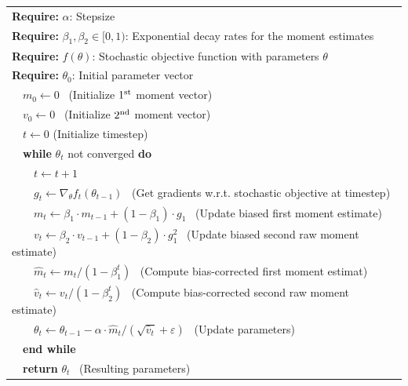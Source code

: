 \documentclass[12pt]{article}
\begin{document}
\hrulefill
\begin{center}
    \begin{tabular}{l}
        \textbf{Require:} $\alpha$: Stepsize\\
        \textbf{Require:} $\beta_1,\beta_2\in [0,1)$: Exponential decay rates for 
        the moment estimates\\
        \textbf{Require:} $f(\theta)$:  Stochastic objective function with 
        parameters $\theta$\\
        \textbf{Require:} $\theta_0$: Initial parameter vector\\
        \ \ $m_0\leftarrow0$ \ (Initialize $\rm 1^{st}$ moment vector)\\
        \ \ $v_0\leftarrow0$  \ (Initialize $\rm 2^{nd}$ moment vector)\\
        \ \ $t\leftarrow0$  (Initialize timestep)\\
        \ \ \textbf{while} $\theta_t$ not converged \textbf{do}\\
        \ \ \ \ $t\leftarrow t+1$\\
        \ \ \ \ $g_t\leftarrow\nabla_\theta f_t(\theta_{t-1})$ \ (Get gradients 
        w.r.t. stochastic objective at timestep)\\
        \ \ \ \ $m_t\leftarrow\beta_1\cdot m_{t-1}+(1-\beta_1)\cdot g_1$ \ (Update biased 
        first moment estimate)\\
        \ \ \ \ $v_t\leftarrow\beta_2\cdot v_{t-1}+(1-\beta_2)\cdot g_1^2$ \ (Update 
        biased second raw moment estimate)\\
        \ \ \ \ $\hat{m}_t\leftarrow m_t/(1-\beta_1^t)$ \ (Compute bias-corrected first 
        moment estimat)\\
        \ \ \ \ $\hat{v}_t\leftarrow v_t/(1-\beta_2^t)$ \ (Compute bias-corrected second 
        raw moment estimate)\\
        \ \ \ \ $\theta_t\leftarrow \theta_{t-1}-\alpha\cdot\hat{m}_t/(\sqrt
        {\hat{v}_t}+\varepsilon)$ \ (Update parameters)\\
        \ \ \textbf{end while}\\
        \ \ \textbf{return} $\theta_t$ \ (Resulting parameters)
    \end{tabular}
\end{center}

\hrulefill
\end{document}
